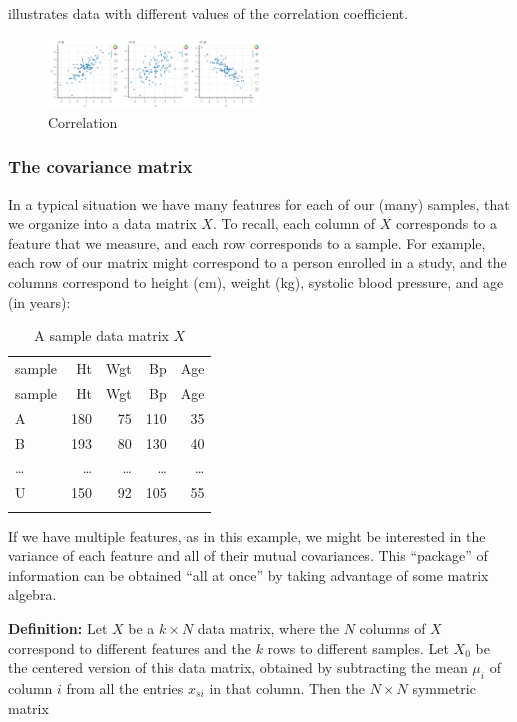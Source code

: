 \documentclass[
]{article}
\begin{document}
 illustrates data with different values of the
correlation coefficient.

\begin{figure}
\hypertarget{fig:corrfig}{%
\centering
\includegraphics[width=0.5\textwidth,height=\textheight]{../img/correlation.png}
\caption{Correlation}\label{fig:corrfig}
}
\end{figure}

\hypertarget{sec:covarmat}{%
\subsubsection{The covariance matrix}\label{sec:covarmat}}

In a typical situation we have many features for each of our (many)
samples, that we organize into a data matrix \(X\). To recall, each
column of \(X\) corresponds to a feature that we measure, and each row
corresponds to a sample. For example, each row of our matrix might
correspond to a person enrolled in a study, and the columns correspond
to height (cm), weight (kg), systolic blood pressure, and age (in
years):

\begin{longtable}[]{@{}lrrrr@{}}
\caption{A sample data matrix \(X\) \label{tbl:data}}\tabularnewline
\toprule
sample & Ht & Wgt & Bp & Age \\ \addlinespace
\midrule
\endfirsthead
\toprule
sample & Ht & Wgt & Bp & Age \\ \addlinespace
\midrule
\endhead
A & 180 & 75 & 110 & 35 \\ \addlinespace
B & 193 & 80 & 130 & 40 \\ \addlinespace
\ldots{} & \ldots{} & \ldots{} & \ldots{} & \ldots{} \\ \addlinespace
U & 150 & 92 & 105 & 55 \\ \addlinespace
\bottomrule
\end{longtable}

If we have multiple features, as in this example, we might be interested
in the variance of each feature and all of their mutual covariances.
This ``package'' of information can be obtained ``all at once'' by
taking advantage of some matrix algebra.

\textbf{Definition:} Let \(X\) be a \(k\times N\) data matrix, where the
\(N\) columns of \(X\) correspond to different features and the \(k\)
rows to different samples. Let \(X_{0}\) be the centered version of this
data matrix, obtained by subtracting the mean \(\mu_{i}\) of column
\(i\) from all the entries \(x_{si}\) in that column. Then the
\(N\times N\) symmetric matrix
\end{document}
